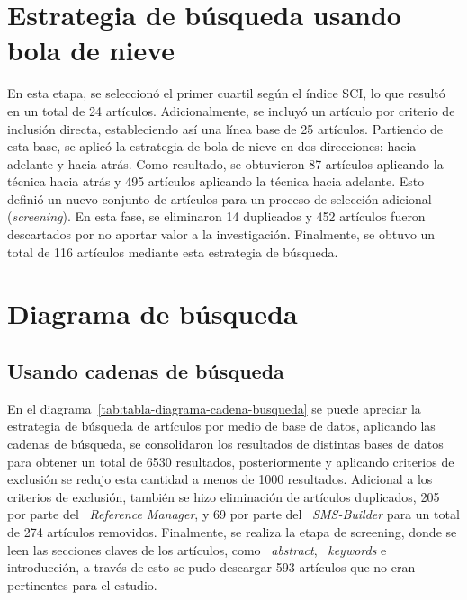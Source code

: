 \section{Estrategia de búsqueda usando bola de nieve}\label{sec:bolaDeNieve}
\noindent
En esta etapa, se seleccionó el primer cuartil según el índice SCI, lo que resultó en un total de 24 artículos. Adicionalmente, se incluyó un artículo por criterio de inclusión directa, estableciendo así una línea base de 25 artículos.
Partiendo de esta base, se aplicó la estrategia de bola de nieve en dos direcciones: hacia adelante y hacia atrás. Como resultado, se obtuvieron 87 artículos aplicando la técnica hacia atrás y 495 artículos aplicando la técnica hacia adelante.
Esto definió un nuevo conjunto de artículos para un proceso de selección adicional (\textit{screening}). En esta fase, se eliminaron 14 duplicados y 452 artículos fueron descartados por no aportar valor a la investigación.
Finalmente, se obtuvo un total de 116 artículos mediante esta estrategia de búsqueda.

\section{Diagrama de búsqueda}\label{sec:diagramaBusqueda}

\subsection{Usando cadenas de búsqueda}
\noindent
En el diagrama~\ref{tab:tabla-diagrama-cadena-busqueda} se puede apreciar la estrategia de búsqueda de artículos por medio de base de datos, aplicando las cadenas de búsqueda, se consolidaron los resultados de distintas bases de datos para obtener un total de 6530 resultados, posteriormente y aplicando criterios de exclusión se redujo esta cantidad a menos de 1000 resultados. Adicional a los criterios de exclusión, también se hizo eliminación de artículos duplicados, 205 por parte del ~\textit{Reference Manager}, y 69 por parte del ~\textit{SMS-Builder} para un total de 274 artículos removidos. Finalmente, se realiza la etapa de screening, donde se leen las secciones claves de los artículos, como ~\textit{abstract}, ~\textit{keywords} e introducción, a través de esto se pudo descargar 593 artículos que no eran pertinentes para el estudio.
\label{img:busqueda-bd}

